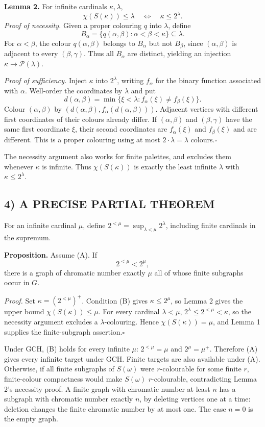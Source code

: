\textbf{Lemma 2.} For infinite cardinals $\kappa,\lambda$,
\[
\chi(S(\kappa))\le\lambda\quad\Longleftrightarrow\quad \kappa\le2^\lambda.
\]
\emph{Proof of necessity.} Given a proper colouring $q$ into $\lambda$, define
\[
B_\alpha=\{q(\alpha,\beta):\alpha<\beta<\kappa\}\subseteq\lambda.
\]
For $\alpha<\beta$, the colour $q(\alpha,\beta)$ belongs to $B_\alpha$ but not $B_\beta$, since $(\alpha,\beta)$ is adjacent to every $(\beta,\gamma)$. Thus all $B_\alpha$ are distinct, yielding an injection $\kappa\to\mathcal P(\lambda)$.

\emph{Proof of sufficiency.} Inject $\kappa$ into $2^\lambda$, writing $f_\alpha$ for the binary function associated with $\alpha$. Well-order the coordinates by $\lambda$ and put
\[
d(\alpha,\beta)=\min\{\xi<\lambda:f_\alpha(\xi)\ne f_\beta(\xi)\}.
\]
Colour $(\alpha,\beta)$ by $(d(\alpha,\beta),f_\alpha(d(\alpha,\beta)))$. Adjacent vertices with different first coordinates of their colours already differ. If $(\alpha,\beta)$ and $(\beta,\gamma)$ have the same first coordinate $\xi$, their second coordinates are $f_\alpha(\xi)$ and $f_\beta(\xi)$ and are different. This is a proper colouring using at most $2\cdot\lambda=\lambda$ colours.\hfill$\square$

The necessity argument also works for finite palettes, and excludes them whenever $\kappa$ is infinite. Thus $\chi(S(\kappa))$ is exactly the least infinite $\lambda$ with $\kappa\le2^\lambda$.

\subsection*{4) A PRECISE PARTIAL THEOREM}
For an infinite cardinal $\mu$, define $2^{<\mu}=\sup_{\lambda<\mu}2^\lambda$, including finite cardinals in the supremum.

\textbf{Proposition.} Assume (A). If
\[
2^{<\mu}<2^\mu,\tag{B}
\]
there is a graph of chromatic number exactly $\mu$ all of whose finite subgraphs occur in $G$.

\emph{Proof.} Set $\kappa=(2^{<\mu})^+$. Condition (B) gives $\kappa\le2^\mu$, so Lemma 2 gives the upper bound $\chi(S(\kappa))\le\mu$. For every cardinal $\lambda<\mu$, $2^\lambda\le2^{<\mu}<\kappa$, so the necessity argument excludes a $\lambda$-colouring. Hence $\chi(S(\kappa))=\mu$, and Lemma 1 supplies the finite-subgraph assertion.\hfill$\square$

Under GCH, (B) holds for every infinite $\mu$: $2^{<\mu}=\mu$ and $2^\mu=\mu^+$. Therefore (A) gives every infinite target under GCH. Finite targets are also available under (A). Otherwise, if all finite subgraphs of $S(\omega)$ were $r$-colourable for some finite $r$, finite-colour compactness would make $S(\omega)$ $r$-colourable, contradicting Lemma 2's necessity proof. A finite graph with chromatic number at least $n$ has a subgraph with chromatic number exactly $n$, by deleting vertices one at a time: deletion changes the finite chromatic number by at most one. The case $n=0$ is the empty graph.

